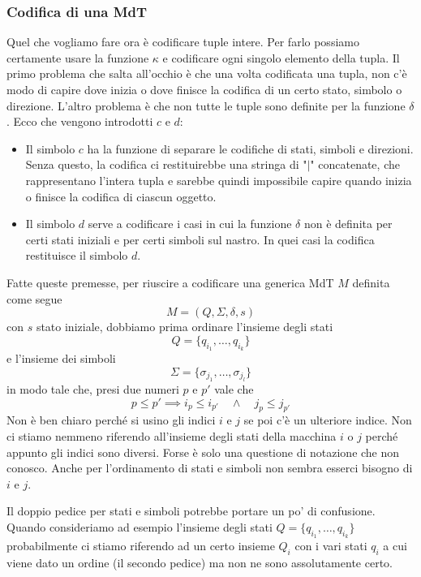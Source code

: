 \subsubsection{Codifica di una MdT}
Quel che vogliamo fare ora è codificare tuple intere. Per farlo
possiamo certamente usare la funzione $\kappa$ e codificare ogni
singolo elemento della tupla. Il primo problema che salta
all'occhio è che una volta codificata una tupla, non c'è modo di
capire dove inizia o dove finisce la codifica di un certo stato,
simbolo o direzione. L'altro problema è che non tutte le tuple
sono definite per la funzione $\delta$. Ecco che vengono
introdotti $c$ e $d$:
\begin{itemize}
	\item Il simbolo $c$ ha la funzione di separare le codifiche
	      di stati, simboli e direzioni. Senza questo, la
	      codifica ci restituirebbe una stringa di "$\mid$"
	      concatenate, che rappresentano l'intera tupla e sarebbe
	      quindi impossibile capire quando inizia o finisce la
	      codifica di ciascun oggetto.
	\item Il simbolo $d$ serve a codificare i casi in cui
	      la funzione $\delta$ non è definita per certi stati
	      iniziali e per certi simboli sul nastro. In quei casi
	      la codifica restituisce il simbolo $d$.
\end{itemize}
Fatte queste premesse, per riuscire a codificare una generica
MdT $M$ definita come segue
\[ M = (Q, \Sigma, \delta, s) \]
con $s$ stato iniziale, dobbiamo prima ordinare l'insieme degli
stati
\[ Q = \{ q_{i_1}, \dots, q_{i_k} \} \]
e l'insieme dei simboli
\[ \Sigma = \{ \sigma_{j_1}, \dots, \sigma_{j_l} \} \]
in modo tale che, presi due numeri $p$ e $p'$ vale che
\[
	p \leq p' \implies i_p \leq i_{p'} \quad
	\land \quad j_p \leq j_{p'}
\]
Non è ben chiaro perché si usino gli indici $i$ e $j$ se poi c'è
un ulteriore indice. Non ci stiamo nemmeno riferendo all'insieme
degli stati della macchina $i$ o $j$ perché appunto gli indici
sono diversi. Forse è solo una questione di notazione che non
conosco. Anche per l'ordinamento di stati e simboli non sembra
esserci bisogno di $i$ e $j$.

Il doppio pedice per stati e simboli potrebbe portare un po' di
confusione. Quando consideriamo ad esempio l'insieme degli stati
$Q = \{ q_{i_1}, \dots, q_{i_k} \}$ probabilmente ci stiamo
riferendo ad un certo insieme $Q_i$ con i vari stati $q_i$ a cui
viene dato un ordine (il secondo pedice) ma non ne sono
assolutamente certo.

